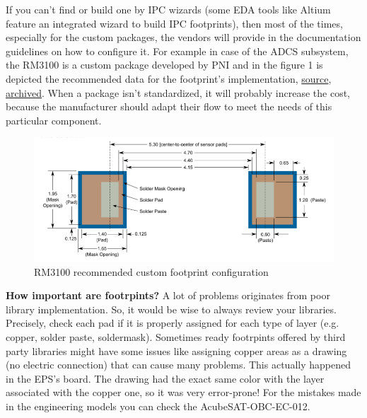 \documentclass[final]{cubedoc}
\begin{document}
	If you can't find or build one by IPC wizards (some EDA tools like Altium feature an integrated wizard to build IPC footprints), then most of the times, especially for the custom packages, the vendors will provide in the documentation guidelines on how to configure it. For example in case of the ADCS subsystem, the RM3100 is a custom package developed by PNI and in the figure 1 is depicted the recommended data for the footprint's implementation, \href{https://www.pnicorp.com/wp-content/uploads/RM3100-Sensor-Suite-User-Manual-R07-1-2.pdf}{source}, \href{https://web.archive.org/web/20200812135747/https://www.pnicorp.com/wp-content/uploads/RM3100-Sensor-Suite-User-Manual-R07-1-2.pdf}{archived}. When a package isn't standardized, it will probably increase the cost, because the manufacturer should adapt their flow to meet the needs of this particular component. %
	
	\begin{figure}
		\centering
		\includegraphics[keepaspectratio, width = \textwidth]{assets/rm3100_foot.png}
		\caption{RM3100 recommended custom footprint configuration}
	\end{figure}
	
	
	
	\textbf{How important are footrpints?}
	A lot of problems originates from poor library implementation. So, it would be wise to always review your libraries. Precisely, check each pad if it is properly assigned for each type of layer (e.g. copper, solder paste, soldermask). Sometimes ready footrpints offered by third party libraries might have some issues like assigning copper areas as a drawing (no electric connection) that can cause many problems. This actually happened in the EPS's board. The drawing had the exact same color with the layer associated with the copper one, so it was very error-prone! For the mistakes made in the engineering models you can check the AcubeSAT-OBC-EC-012.
	
\end{document}
